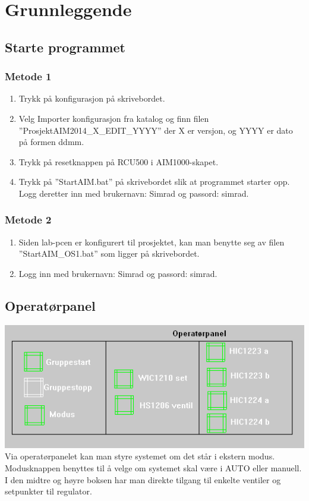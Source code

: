 \section{Grunnleggende}
\subsection{Starte programmet}
\subsubsection*{Metode 1}
\begin{enumerate}
	\item Trykk på konfigurasjon på skrivebordet.
  \item Velg Importer konfigurasjon fra katalog og finn filen ''ProsjektAIM2014\_X\_EDIT\_YYYY'' der X er versjon, og YYYY er dato på formen ddmm.
  \item Trykk på resetknappen på RCU500 i AIM1000-skapet.
	\item Trykk på ''StartAIM.bat'' på skrivebordet slik at programmet starter opp. Logg deretter inn med brukernavn: Simrad og passord: simrad. 
\end{enumerate}

\subsubsection*{Metode 2}
\begin{enumerate}
  \item Siden lab-pcen er konfigurert til prosjektet, kan man benytte seg av filen ''StartAIM\_OS1.bat'' som ligger på skrivebordet.
  \item Logg inn med brukernavn: Simrad og passord: simrad.
\end{enumerate}

\subsection{Operatørpanel}
\includegraphics[]{operatorpanel.png} \\
Via operatørpanelet kan man styre systemet om det står i ekstern modus. Modusknappen benyttes til å velge om systemet skal være i AUTO eller manuell. I den midtre og høyre boksen har man direkte tilgang til enkelte ventiler og setpunkter til regulator.
 


